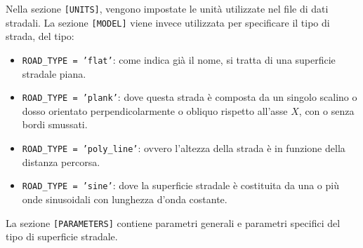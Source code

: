 Nella sezione \texttt{[UNITS]}, vengono impostate le unità utilizzate nel file di dati stradali. La sezione \texttt{[MODEL]} viene invece utilizzata per specificare il tipo di strada, del tipo:
\begin{itemize}
	\item \texttt{ROAD\_TYPE = 'flat'}: come indica già il nome, si tratta di una superficie stradale piana.
	\item \texttt{ROAD\_TYPE = 'plank'}: dove questa strada è composta da un singolo scalino o dosso orientato perpendicolarmente o obliquo rispetto all'asse $X$, con o senza bordi smussati.
	\item \texttt{ROAD\_TYPE = 'poly\_line'}: ovvero l'altezza della strada è in funzione della distanza percorsa.
	\item \texttt{ROAD\_TYPE = 'sine'}: dove la superficie stradale è costituita da una o più onde sinusoidali con lunghezza d'onda costante.
\end{itemize}
La sezione \texttt{[PARAMETERS]} contiene parametri generali e parametri specifici del tipo di superficie stradale.

